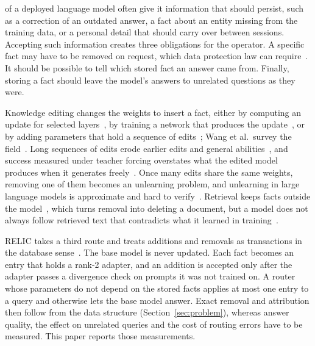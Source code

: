 \documentclass[journal,10pt]{IEEEtran}
\begin{document}
 of a deployed language model often give it information that should persist,
such as a correction of an outdated answer, a fact about an entity missing from the training data, or a
personal detail that should carry over between sessions. Accepting such information creates three
obligations for the operator. A specific fact may have to be removed on request, which data protection
law can require~\cite{gdpr2016}. It should be possible to tell which stored fact an answer came from.
Finally, storing a fact should leave the model's answers to unrelated questions as they were.

Knowledge editing changes the weights to insert a fact, either by computing an update for selected
layers~\cite{meng2022rome,meng2023memit,fang2025alphaedit}, by training a network that produces the
update~\cite{decao2021editing,mitchell2022mend}, or by adding parameters that hold a sequence of
edits~\cite{huang2023tpatcher,hartvigsen2023grace,wang2024wise}; Wang et al.\ survey the
field~\cite{wang2025kesurvey}. Long sequences of edits erode earlier edits and general
abilities~\cite{gupta2024forgetting,gu2024harms}, and success measured under teacher forcing overstates
what the edited model produces when it generates freely~\cite{yang2025mirage}. Once many edits share the
same weights, removing one of them becomes an unlearning problem, and unlearning in large language models
is approximate and hard to verify~\cite{eldan2023harrypotter,maini2024tofu,shi2025muse}. Retrieval keeps
facts outside the model~\cite{lewis2020rag}, which turns removal into deleting a document, but a model
does not always follow retrieved text that contradicts what it learned in
training~\cite{longpre2021conflicts,xie2024chameleon}.

RELIC takes a third route and treats additions and removals as transactions in the database
sense~\cite{haerder1983transactions}. The base model is never updated. Each fact becomes an entry that
holds a rank-2 adapter, and an addition is accepted only after the adapter passes a divergence check on
prompts it was not trained on. A router whose parameters do not depend on the stored facts applies at
most one entry to a query and otherwise lets the base model answer. Exact removal and attribution then
follow from the data structure (Section~\ref{sec:problem}), whereas answer quality, the effect on
unrelated queries and the cost of routing errors have to be measured. This paper reports those
measurements.
\end{document}
